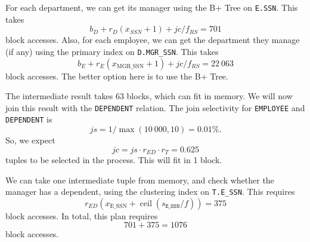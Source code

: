 \documentclass[a4paper, openany]{memoir}
\theoremstyle{definition}
\begin{document}
\begin{answer}
\begin{enumerate}
        For each department, we can get its manager using the B+ Tree on \texttt{E.SSN}. This takes
        \[b_D + r_D(x_{SSN} + 1) + \textit{jc}/f_{RS} = 701\]
        block accesses. Also, for each employee, we can get the department they manage (if any) using the primary index on \texttt{D.MGR\_SSN}. This takes
        \[b_E + r_E(x_{\text{MGR\_SSN}} + 1) + \textit{jc}/f_{RS} = 22 \ 063\]
        block accesses. The better option here is to use the B+ Tree. 
        
        The intermediate result takes 63 blocks, which can fit in memory. We will now join this result with the \texttt{DEPENDENT} relation. The join selectivity for \texttt{EMPLOYEE} and \texttt{DEPENDENT} is
        \[\textit{js} = 1/\max(10 \ 000, 10) = 0.01\%.\]
        So, we expect
        \[\textit{jc} = \textit{js} \cdot r_{ED} \cdot r_T = 0.625\]
        tuples to be selected in the process. This will fit in 1 block.
        
        We can take one intermediate tuple from memory, and check whether the manager has a dependent, using the clustering index on \texttt{T.E\_SSN}. This requires
        \[r_{ED} (x_{\text{E\_SSN}} + \operatorname{ceil}(s_{\texttt{E\_SSN}}/f)) = 375\]
        block accesses. In total, this plan requires
        \[701 + 375 = 1076\]
        block accesses.
    \end{enumerate}
\end{answer}
\end{document}
